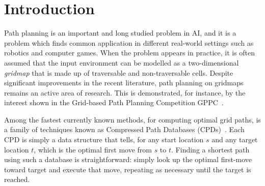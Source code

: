 \section{Introduction}
Path planning is an important and long studied problem in AI, and 
it is a problem which finds common application in different real-world
settings such as robotics and computer games.
When the problem appears in practice, it is often assumed that the
input environment can be modelled as a two-dimensional \emph{gridmap}
that is made up of traversable and non-traversable cells.
Despite significant improvements in the recent literature, path planning on 
gridmaps remains an active area of research. 
This is demonstrated, for instance, by the interest shown in the Grid-based 
Path Planning Competition GPPC~\cite{DBLP:conf/socs/SturtevantTTUKS15}.

Among the fastest currently known methods, for computing optimal grid paths,
is a family of techniques known as Compressed Path Databases 
(CPDs)~\cite{botea-aiide11,bh-ppcap-13}.
Each CPD is simply a data structure that tells, for any start location 
$s$ and any target location $t$, which is the optimal first move from $s$ to $t$.
Finding a shortest path using such a database is straightforward: 
simply look up the optimal first-move toward target and execute that move, 
repeating as necessary until the target is reached.

%
%


